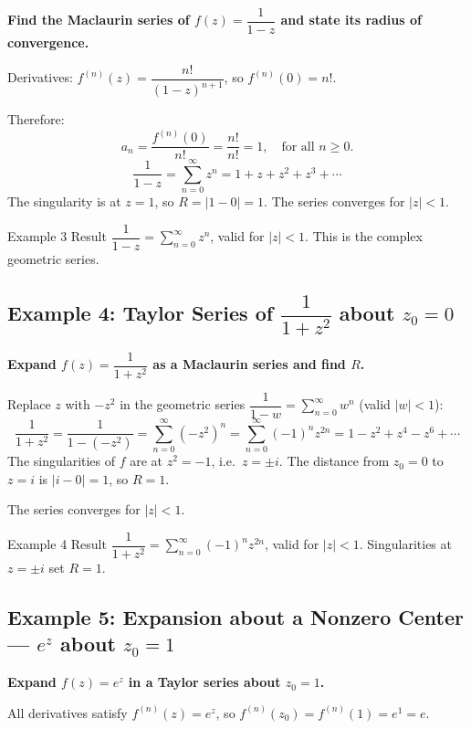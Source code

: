 \documentclass[12pt,a4paper]{article}
\begin{document}
\textbf{Find the Maclaurin series of $f(z) = \dfrac{1}{1-z}$ and state its radius of convergence.}

\medskip
Derivatives: $f^{(n)}(z) = \dfrac{n!}{(1-z)^{n+1}}$, so $f^{(n)}(0) = n!$.

Therefore:
\[
  a_n = \frac{f^{(n)}(0)}{n!} = \frac{n!}{n!} = 1, \quad \text{for all } n \geq 0.
\]
\[
  \frac{1}{1-z} = \sum_{n=0}^{\infty} z^n = 1 + z + z^2 + z^3 + \cdots
\]
The singularity is at $z = 1$, so $R = |1 - 0| = 1$. The series converges for $|z| < 1$.

\begin{learnbox}{Example 3 Result}
$\dfrac{1}{1-z} = \displaystyle\sum_{n=0}^{\infty} z^n$, valid for $|z| < 1$. This is the complex geometric series.
\end{learnbox}

\subsection*{Example 4: Taylor Series of $\dfrac{1}{1+z^2}$ about $z_0 = 0$}

\textbf{Expand $f(z) = \dfrac{1}{1+z^2}$ as a Maclaurin series and find $R$.}

\medskip
Replace $z$ with $-z^2$ in the geometric series $\dfrac{1}{1-w} = \sum_{n=0}^{\infty} w^n$ (valid $|w|<1$):
\[
  \frac{1}{1+z^2} = \frac{1}{1-(-z^2)} = \sum_{n=0}^{\infty} (-z^2)^n = \sum_{n=0}^{\infty} (-1)^n z^{2n}
  = 1 - z^2 + z^4 - z^6 + \cdots
\]
The singularities of $f$ are at $z^2 = -1$, i.e.\ $z = \pm i$. The distance from $z_0 = 0$ to $z = i$ is $|i - 0| = 1$, so $R = 1$.

The series converges for $|z| < 1$.

\begin{learnbox}{Example 4 Result}
$\dfrac{1}{1+z^2} = \displaystyle\sum_{n=0}^{\infty}(-1)^n z^{2n}$, valid for $|z|<1$. Singularities at $z=\pm i$ set $R=1$.
\end{learnbox}

\subsection*{Example 5: Expansion about a Nonzero Center --- $e^z$ about $z_0 = 1$}

\textbf{Expand $f(z) = e^z$ in a Taylor series about $z_0 = 1$.}

\medskip
All derivatives satisfy $f^{(n)}(z) = e^z$, so $f^{(n)}(z_0) = f^{(n)}(1) = e^1 = e$.
\end{document}
